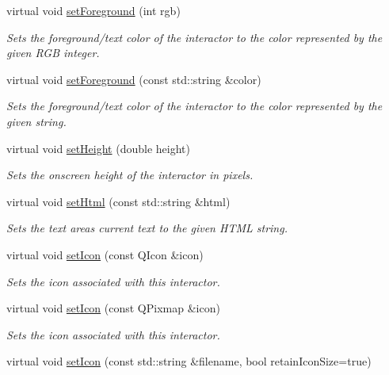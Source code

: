 \begin{DoxyCompactItemize}
virtual void \mbox{\hyperlink{classsgl_1_1GInteractor_a9eb856b5ff83a19df3831a31f15f4563}{set\+Foreground}} (int rgb)
\begin{DoxyCompactList}\small\item\em Sets the foreground/text color of the interactor to the color represented by the given R\+GB integer. \end{DoxyCompactList}\item 
virtual void \mbox{\hyperlink{classsgl_1_1GInteractor_af59209aeadea6dfc6d97a2d8531f50e1}{set\+Foreground}} (const std\+::string \&color)
\begin{DoxyCompactList}\small\item\em Sets the foreground/text color of the interactor to the color represented by the given string. \end{DoxyCompactList}\item 
virtual void \mbox{\hyperlink{classsgl_1_1GInteractor_a9e280bfc4544dfaf8e4376c4e1a74357}{set\+Height}} (double height)
\begin{DoxyCompactList}\small\item\em Sets the onscreen height of the interactor in pixels. \end{DoxyCompactList}\item 
virtual void \mbox{\hyperlink{classsgl_1_1GTextArea_a71ca94fd0ab4223097c4d524ddafe94f}{set\+Html}} (const std\+::string \&html)
\begin{DoxyCompactList}\small\item\em Sets the text area\textquotesingle{}s current text to the given H\+T\+ML string. \end{DoxyCompactList}\item 
virtual void \mbox{\hyperlink{classsgl_1_1GInteractor_a542abfcd7261751352af129c7215ecda}{set\+Icon}} (const Q\+Icon \&icon)
\begin{DoxyCompactList}\small\item\em Sets the icon associated with this interactor. \end{DoxyCompactList}\item 
virtual void \mbox{\hyperlink{classsgl_1_1GInteractor_a368e1a338f84401c284506d03b1ba769}{set\+Icon}} (const Q\+Pixmap \&icon)
\begin{DoxyCompactList}\small\item\em Sets the icon associated with this interactor. \end{DoxyCompactList}\item 
virtual void \mbox{\hyperlink{classsgl_1_1GInteractor_a762e139aa311461c3984d3ad28293f64}{set\+Icon}} (const std\+::string \&filename, bool retain\+Icon\+Size=true)

\end{DoxyCompactItemize}
